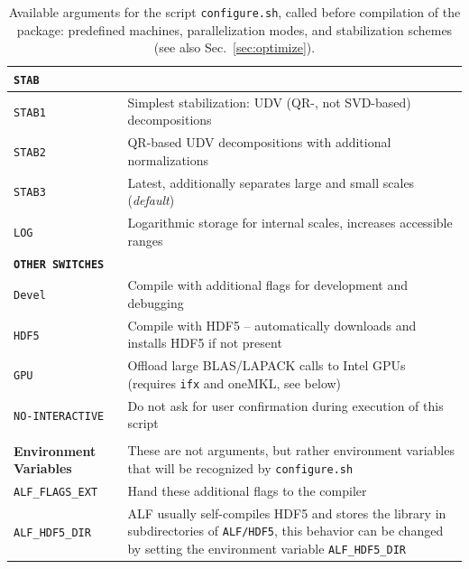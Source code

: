 \begin{table}[!ht]
\begin{center}
\begin{tabular}{@{} p{} p{} @{}}
			\textbf{\texttt{STAB}} &  \\\midrule
			\texttt{STAB1}  &  Simplest stabilization: UDV (QR-, not SVD-based) decompositions\\
			\texttt{STAB2}  &  QR-based UDV decompositions with additional normalizations\\
			\texttt{STAB3}  &  Latest, additionally separates large and small scales (\emph{default})\\
			\texttt{LOG}  &  Logarithmic storage for internal scales, increases accessible ranges
			\vspace{7pt}\\
			
			\textbf{\texttt{OTHER SWITCHES}} &  \\\midrule
			\texttt{Devel}  &  Compile with additional flags for development and debugging\\
			\texttt{HDF5}  &  Compile with HDF5 -- automatically downloads and installs HDF5 if not present\\
			\texttt{GPU}  &  Offload large BLAS/LAPACK calls to Intel GPUs (requires \texttt{ifx} and oneMKL, see below)\\
			\texttt{NO-INTERACTIVE} & Do not ask for user confirmation during execution of this script\\
			\vspace{7pt}\\
			
			\textbf{Environment Variables} & These are not arguments, but rather environment variables that will be recognized by \texttt{configure.sh}  \\\midrule
			\texttt{ALF\_FLAGS\_EXT}  & Hand these additional flags to the compiler\\
			\texttt{ALF\_HDF5\_DIR}  & ALF usually self-compiles HDF5 and stores the library in subdirectories of \texttt{ALF/HDF5},
			                         this behavior can be changed by setting the environment variable \texttt{ALF\_HDF5\_DIR}\\
			\bottomrule
		\end{tabular}
		\caption{Available arguments for the script \texttt{configure.sh}, called before compilation of the package: predefined machines, parallelization modes, and stabilization schemes (see also Sec.~\ref{sec:optimize}).} \label{table:configureHPC}
	\end{center}
\end{table}

